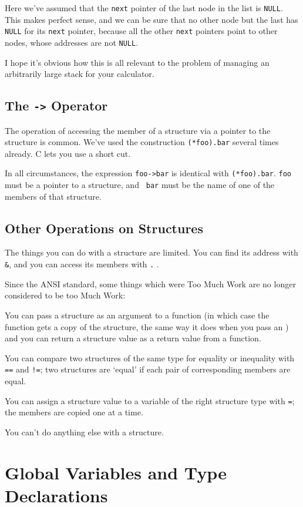 Here we've assumed that the {\tt next} pointer of the last node in the
list is {\tt NULL}.  This makes perfect sense, and we can be sure that
no other node but the last has {\tt NULL} for its {\tt next} pointer,
because all the other {\tt next} pointers point to other nodes, whose
addresses are not {\tt NULL}. 

I hope it's obvious how this is all relevant to the problem of managing
an arbitrarily large stack for your calculator.  

\subsection{The {\tt ->} Operator}

The operation of accessing the member of a structure via a pointer to
the structure is common.  We've used the construction {\tt (*foo).bar}
several times already.  C lets you use a short cut.

In all circumstances, the expression {\tt foo->bar} is identical with
{\tt (*foo).bar}.  {\tt foo} must be a pointer to a structure, and {\tt
bar} must be the name of one of the members of that structure. 

\subsection{Other Operations on Structures}

The things you can do with a structure are limited.  You can find its
address with {\tt\&}, and you can access its members with {\tt .} .  

Since the ANSI standard, some things which were Too Much Work are no
longer considered to be too Much Work:

You can pass a structure as an argument to a function (in which case the
function gets a copy of the structure, the same way it does when you
pass an \int) and you can return a structure value as a return value
from a function. 

You can compare two structures of the same type for equality or
inequality with {\tt ==} and {\tt !=}; two structures are `equal' if
each pair of corresponding members are equal.  

You can assign a structure value to a variable of the right structure
type with {\tt =}; the members are copied one at a time.  

You can't do anything else with a structure.

\section{Global Variables and Type Declarations}

